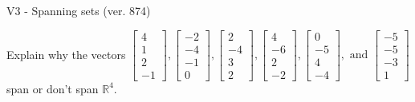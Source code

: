 \begin{exercise}
  \begin{exerciseTitle}V3 - Spanning sets (ver. 874)\end{exerciseTitle}
  \begin{exerciseStatement}
    Explain why the vectors \(\left[\begin{array}{r}
4 \\
1 \\
2 \\
-1
\end{array}\right] , \left[\begin{array}{r}
-2 \\
-4 \\
-1 \\
0
\end{array}\right] , \left[\begin{array}{r}
2 \\
-4 \\
3 \\
2
\end{array}\right] , \left[\begin{array}{r}
4 \\
-6 \\
2 \\
-2
\end{array}\right] , \left[\begin{array}{r}
0 \\
-5 \\
4 \\
-4
\end{array}\right] , \text{ and } \left[\begin{array}{r}
-5 \\
-5 \\
-3 \\
1
\end{array}\right]\) span or don't span \(\mathbb{R}^4\). 
	



\end{exerciseStatement}
\end{exercise}
